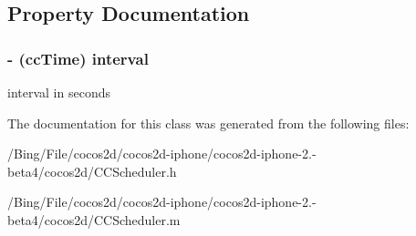\subsection{Property Documentation}
\hypertarget{interface_c_c_timer_aeaaa2a181fc46f104e567d69b96c6a47}{
\subsubsection[{interval}]{\setlength{\rightskip}{0pt plus 5cm}-\/ ({\bf cc\-Time}) {\bf interval}}}\label{interface_c_c_timer_aeaaa2a181fc46f104e567d69b96c6a47}
interval in seconds 

The documentation for this class was generated from the following files\-:\begin{DoxyCompactItemize}
\item 
/\-Bing/\-File/cocos2d/cocos2d-\/iphone/cocos2d-\/iphone-\/2.-\/beta4/cocos2d/C\-C\-Scheduler.\-h\item 
/\-Bing/\-File/cocos2d/cocos2d-\/iphone/cocos2d-\/iphone-\/2.-\/beta4/cocos2d/C\-C\-Scheduler.\-m\end{DoxyCompactItemize}
